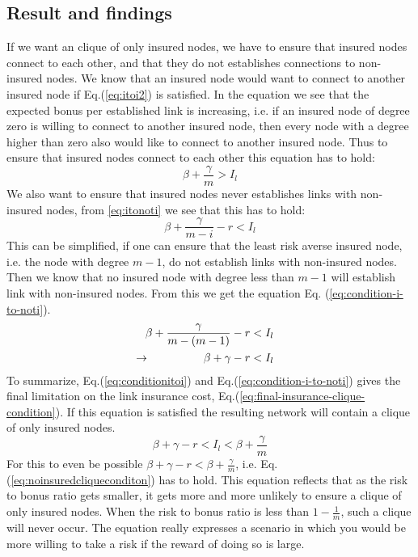 \subsection{Result and findings}

If we want an clique of only insured nodes, we have to ensure that insured nodes connect to each other, and that they do not establishes connections to non-insured nodes.
We know that an insured node would want to connect to another insured node if  Eq.(\ref{eq:itoi2}) is satisfied. 
In the equation we see that the expected bonus per established link is increasing, i.e. if an insured node of degree zero is willing to connect to another insured node, then every node with a degree higher than zero also would like to connect to another insured node. Thus to ensure that insured nodes connect to each other this equation has to hold:
\begin{equation}
\beta+\frac{\gamma}{m}>I_{l}
\label{eq:conditionitoi}
\end{equation}
We also want to ensure that insured nodes never establishes links with non-insured nodes, from \ref{eq:itonoti} we see that this has to hold:
\begin{equation}
\beta+\frac{\gamma}{m-i}-r < I_{l}
\label{eq:conditionitonoti}
\end{equation}
This can be simplified, if one can ensure that the least risk averse insured node, i.e. the node with degree $m-1$, do not establish links with non-insured nodes. Then we know that no insured node with degree less than $m-1$ will establish link with non-insured nodes. From this we get the equation Eq. (\ref{eq:condition-i-to-noti}).
\begin{eqnarray}
\beta+\frac{\gamma}{m-(m-1)}-r&<I_{l} \nonumber\\
\llap{$\rightarrow$\hspace{50pt}} \beta+\gamma-r&<I_{l}
\label{eq:condition-i-to-noti}
\end{eqnarray}
To summarize, Eq.(\ref{eq:conditionitoi}) and Eq.(\ref{eq:condition-i-to-noti}) gives the final limitation on the link insurance cost, Eq.(\ref{eq:final-insurance-clique-condition}). If this equation is satisfied the resulting network will contain a clique of only insured nodes.
\begin{equation}
\beta+\gamma-r<I_{l}<\beta+\frac{\gamma}{m}
\label{eq:final-insurance-clique-condition}
\end{equation}
For this to even be possible $\beta+\gamma-r<\beta+\frac{\gamma}{m}$, i.e. Eq.(\ref{eq:noinsuredcliqueconditon}) has to hold. This equation reflects that as the risk to bonus ratio gets smaller, it gets more and more unlikely to ensure a clique of only insured nodes. When the risk to bonus ratio is less than $1-\frac{1}{m}$, such a clique will never occur. The equation really expresses a scenario in which you would be more willing to take a risk if the reward of doing so is large.
